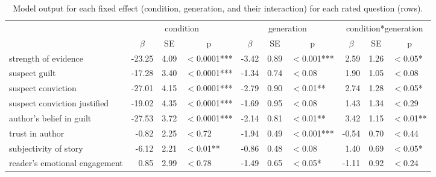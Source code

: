 \documentclass[10pt,letterpaper]{article}
\begin{document}
	\begin{table}
		\centering
		\caption{Model output for each fixed effect (condition, generation, and their interaction) for each rated question (rows).}
		\vskip 0.12in
		\begin{tabular}{l r r l r r l r r l }
			\toprule
			& \multicolumn{3}{c}{condition} & \multicolumn{3}{c}{generation} & \multicolumn{3}{c}{condition*generation} \\ \cmidrule(r){2-4} \cmidrule(r){5-7} \cmidrule(r){8-10}
			& \multicolumn{1}{c}{$\beta$} & \multicolumn{1}{c}{SE} & \multicolumn{1}{c}{p} & \multicolumn{1}{c}{$\beta$} & \multicolumn{1}{c}{SE} & \multicolumn{1}{c}{p} & \multicolumn{1}{c}{$\beta$} & \multicolumn{1}{c}{SE} & \multicolumn{1}{c}{p}\\ 
			\midrule
			strength of evidence    & -23.25 & 4.09 & $<$0.0001***        & -3.42 & 0.89 & $<$0.001*** & 2.59  & 1.26 & $<$0.05*\\
			suspect guilt          & -17.28  & 3.40 & $<$0.0001***              & -1.34 & 0.74 & $<$0.08           & 1.90  & 1.05 & $<$0.08\\
			suspect conviction   & -27.01 & 4.15  & $<$0.0001***            & -2.79 & 0.90 & $<$0.01**     & 2.74  & 1.28 & $<$0.05*\\
			suspect conviction justified    & -19.02 & 4.35 & $<$0.0001***  & -1.69 & 0.95 & $<$0.08      & 1.43 & 1.34 & $<$0.29\\
			author's belief in guilt     & -27.53 & 3.72 & $<$0.0001***     & -2.14 & 0.81 & $<$0.01**      & 3.42  & 1.15 & $<$0.01**\\
			trust in author           & -0.82   & 2.25 & $<$0.72                  & -1.94 & 0.49 & $<$0.001*** & -0.54 & 0.70 & $<$0.44 \\
			subjectivity of story  & -6.12   & 2.21 & $<$0.01**                 & -0.86 & 0.48 & $<$0.08         & 1.40   & 0.69 & $<$0.05*\\
			reader's emotional engagement  & 0.85   & 2.99 & $<$0.78   & -1.49 & 0.65 & $<$0.05*     & -1.11  & 0.92 & $<$0.24\\
					\bottomrule
		\end{tabular}
		\label{tab:exp2results}
	\end{table}
\end{document}
